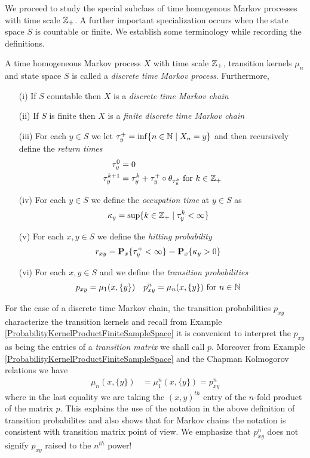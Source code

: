 We proceed to study the special subclass of time homogenous Markov processes with time
scale $\integers_+$.  A further important specialization occurs when
the state space $S$ is countable or finite.  We establish
some terminology while recording the definitions.
\begin{defn}A time homogeneous Markov process $X$ with time scale
  $\integers_+$, transition kernels $\mu_n$ and state space $S$ is called a
  \emph{discrete time Markov process}.  Furthermore,
\begin{itemize}
\item[(i)]If  $S$ countable then $X$ is a
  \emph{discrete time Markov chain} 
\item[(ii)]If  $S$ is finite then $X$ is a \emph{finite discrete time
    Markov chain}
\item[(iii)]For each $y \in S$ we let $\tau^+_y
  = \inf \lbrace n \in \naturals \mid X_n = y \rbrace$ and then
  recursively define the \emph{return times}
\begin{align*}
\tau^0_y &= 0 \\
\tau^{k+1}_y &= \tau^k_y + \tau^+_y \circ \theta_{\tau^k_y} \text{ for
  $k \in \integers_+$}
\end{align*}
\item[(iv)]For each $y \in S$ we define the \emph{occupation time} at $y \in S$ as
\begin{align*}
\kappa_y &= \sup \lbrace k \in \integers_+ \mid \tau^k_y < \infty \rbrace
\end{align*}
\item[(v)]For each $x,y \in S$ we define the \emph{hitting probability} 
\begin{align*} 
r_{xy} &= \sprobability{\tau^+_y < \infty}{x} = \sprobability{\kappa_y >
0}{x} 
\end{align*}
\item[(vi)]For each $x,y \in S$ and we define the \emph{transition probabilities}
\begin{align*}
p_{xy} &= \mu_1(x, \lbrace y \rbrace) &
p^n_{xy} &= \mu_n(x, \lbrace y \rbrace) \text{ for $n \in \naturals$}
\end{align*}
\end{itemize}
\end{defn}
For the case of a discrete time Markov chain, the transition
probabilities $p_{xy}$ characterize the transition kernels and recall
from Example \ref{ProbabilityKernelProductFiniteSampleSpace} it is
convenient to interpret the $p_{xy}$ as being the entries of a
\emph{transition matrix}
we shall call $p$.  Moreover
from Example \ref{ProbabilityKernelProductFiniteSampleSpace} and the
Chapman Kolmogorov relations we have 
\begin{align*}
\mu_n(x, \lbrace y \rbrace) &= \mu_1^n(x, \lbrace y \rbrace) =
p_{xy}^n
\end{align*}
where in the last equality we are taking the $(x,y)^{th}$ entry of the
$n$-fold product of the matrix $p$.  This explains the use of the
notation in the above definition of transition probabilites and also shows that for Markov chains
the notation is consistent with transition matrix point of view.  We
emphasize that $p^n_{xy}$ does not signify $p_{xy}$ raised to the
$n^{th}$ power!

